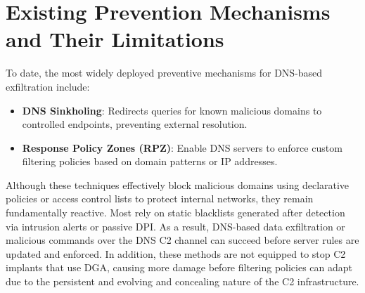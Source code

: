 \documentclass [11pt, proquest] {uwthesis}[2020/02/24]
\begin{document}
\section{Existing Prevention Mechanisms and Their Limitations}
To date, the most widely deployed preventive mechanisms for DNS-based exfiltration include:
\begin{itemize}
\item \textbf{DNS Sinkholing}: Redirects queries for known malicious domains to controlled endpoints, preventing external resolution.
\item \textbf{Response Policy Zones (RPZ)}: Enable DNS servers to enforce custom filtering policies based on domain patterns or IP addresses.
\end{itemize}
Although these techniques effectively block malicious domains using declarative policies or access control lists to protect internal networks, they remain fundamentally reactive. Most rely on static blacklists generated after detection via intrusion alerts or passive DPI. As a result, DNS-based data exfiltration or malicious commands over the DNS C2 channel can succeed before server rules are updated and enforced. In addition, these methods are not equipped to stop C2 implants that use DGA, causing more damage before filtering policies can adapt due to the persistent and evolving and concealing nature of the C2 infrastructure.


\end{document}
